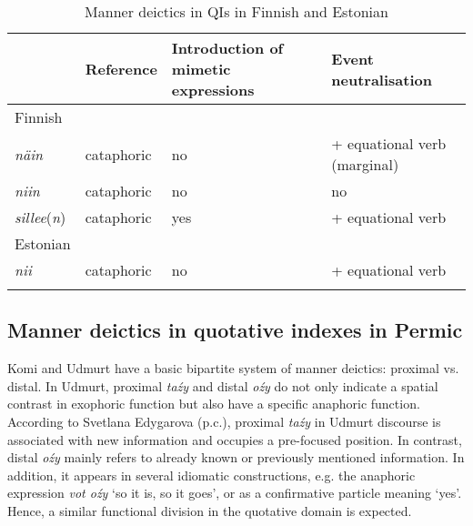 \documentclass[output=paper,colorlinks,citecolor=brown]{langscibook}
\begin{document}
\begin{table}
\begin{tabularx}{\textwidth}{llQQ}
\lsptoprule
& \textbf{Reference} & \textbf{Introduction of mimetic expressions} & \textbf{Event neutralisation}\\
\midrule
Finnish & & & \\
\midrule
\textit{näin} & cataphoric & no & + equational verb (marginal) \\
\textit{niin} & cataphoric & no & no\\
\textit{sillee}(\textit{n}) & cataphoric & yes & + equational verb\\ 

\tablevspace
Estonian & & & \\
\midrule
\textit{nii} & cataphoric & no & + equational verb\\ 
\lspbottomrule
\end{tabularx}
\caption{Manner deictics in QIs in Finnish and Estonian}\label{tab:teptiuk:2}
\end{table}

\subsection{ Manner deictics in quotative indexes in Permic}\label{sec:teptiuk:4.2}

Komi and Udmurt have a basic bipartite system of manner deictics: proximal vs. distal. In Udmurt, proximal \textit{taźy} and distal \textit{oźy} do not only indicate a spatial contrast in exophoric function but also have a specific anaphoric function. According to Svetlana Edygarova (p.c.), proximal \textit{taźy} in Udmurt discourse is associated with new information and occupies a pre-focused position. In contrast, distal \textit{oźy} mainly refers to already known or previously mentioned information. In addition, it appears in several idiomatic constructions, e.g. the anaphoric expression \textit{vot oźy} ‘so it is, so it goes’, or as a confirmative particle meaning ‘yes’. Hence, a similar functional division in the quotative domain is expected.
\end{document}
